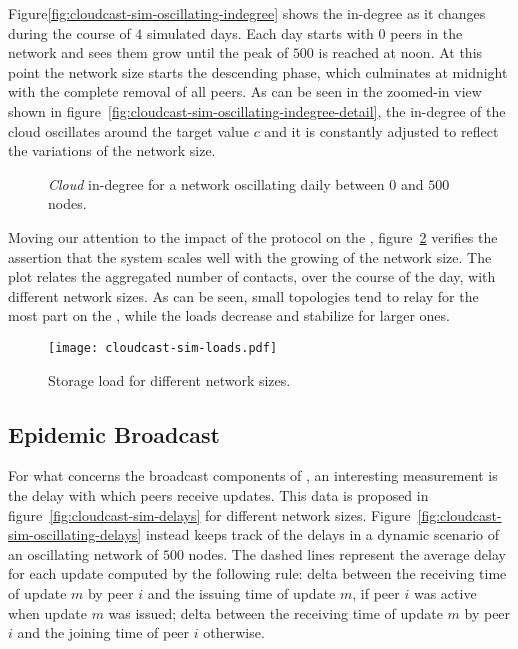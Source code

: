 Figure\ref{fig:cloudcast-sim-oscillating-indegree} shows the
\cloud in-degree as it changes during the course of $4$ simulated
days. Each day starts with $0$ peers in the network and sees them grow
until the peak of $500$ is reached at noon. At this point the network size starts
the descending phase, which culminates at midnight with the complete removal of all
peers. As can be seen in the zoomed-in view shown in
figure~\ref{fig:cloudcast-sim-oscillating-indegree-detail}, the
in-degree of the cloud oscillates around the target value $c$ and it is
constantly adjusted to reflect the variations of the network size.

\begin{figure}[H]
  \centering
  \caption{\emph{Cloud} in-degree for a network oscillating daily
    between $0$ and $500$ nodes.}
  \label{fig:cloudcast-sim-oscillating-indegree-global}
\end{figure}

Moving our attention to the impact of the \peersampling protocol on
the \cloud, figure~\ref{fig:cloudcast-sim-loads} verifies the assertion
that the system scales well with the growing of the network size. The
plot relates the aggregated number of \cloud contacts, over the course
of the day, with different network sizes. As can be seen, small topologies
tend to relay for the most part on the \cloud, while the loads
decrease and stabilize for larger ones.

\begin{figure}[H]
  \centering
  \texttt{[image: cloudcast-sim-loads.pdf]}
  \caption{Storage \cloud load for different network sizes.}
  \label{fig:cloudcast-sim-loads}
\end{figure}

\subsection{Epidemic Broadcast}
For what concerns the \epidemic broadcast components of
\cloudcast, an interesting measurement is the delay with which peers
receive updates. This data is proposed in
figure~\ref{fig:cloudcast-sim-delays} for different network sizes.
Figure~\ref{fig:cloudcast-sim-oscillating-delays} instead keeps track
of the delays in a dynamic scenario of an oscillating network of
$500$ nodes. The dashed lines represent the average delay for each
update computed by the following rule: delta between the receiving
time of update $m$ by peer $i$ and the issuing time of update $m$, if
peer $i$ was active when update $m$ was issued; delta between the
receiving time of update $m$ by peer $i$ and the joining time of peer
$i$ otherwise.

